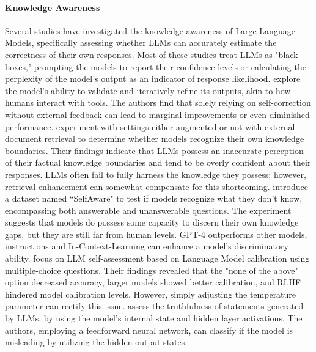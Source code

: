\paragraph{Knowledge Awareness}
Several studies have investigated the knowledge awareness of Large Language Models, specifically assessing whether LLMs can accurately estimate the correctness of their own responses. Most of these studies treat LLMs as "black boxes," prompting the models to report their confidence levels or calculating the perplexity of the model's output as an indicator of response likelihood. \citet{gou2023critic} explore the model's ability to validate and iteratively refine its outputs, akin to how humans interact with tools. The authors find that solely relying on self-correction without external feedback can lead to marginal improvements or even diminished performance. \cite{ren2023investigating} experiment with settings either augmented or not with external document retrieval to determine whether models recognize their own knowledge boundaries. Their findings indicate that LLMs possess an inaccurate perception of their factual knowledge boundaries and tend to be overly confident about their responses. LLMs often fail to fully harness the knowledge they possess; however, retrieval enhancement can somewhat compensate for this shortcoming. \citet{yin-etal-2023-large} introduce a dataset named ``SelfAware" to test if models recognize what they don't know, encompassing both answerable and unanswerable questions. The experiment suggests that models do possess some capacity to discern their own knowledge gaps, but they are still far from human levels. GPT-4 outperforms other models, instructions and In-Context-Learning \cite{ICL} can enhance a model's discriminatory ability. \citet{kadavath2022language} focus on LLM self-assessment based on Language Model calibration using multiple-choice questions. Their findings revealed that the "none of the above" option decreased accuracy, larger models showed better calibration, and RLHF hindered model calibration levels. However, simply adjusting the temperature parameter can rectify this issue.  \citet{azaria2023internal} assess the truthfulness of statements generated by LLMs, by using the model's internal state and hidden layer activations. The authors, employing a feedforward neural network, can classify if the model is misleading by utilizing the hidden output states.

